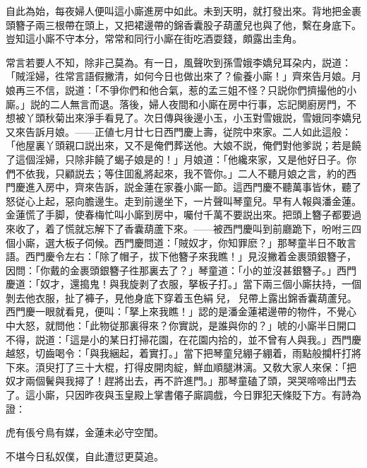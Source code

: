 自此為始，每夜婦人便叫這小廝進房中如此。未到天明，就打發出來。背地把金裹頭簪子兩三根帶在頭上，又把裙邊帶的錦香囊股子葫蘆兒也與了他，繫在身底下。豈知這小廝不守本分，常常和同行小廝在街吃酒耍錢，頗露出圭角。

常言若要人不知，除非己莫為。有一日，風聲吹到孫雪娥李嬌兒耳朶内，説道：「賊淫婦，徃常言語假撇清，如何今日也做出來了？偸養小廝！」齊來告月娘。月娘再三不信，説道：「不爭你們和他合氣，惹的孟三姐不怪？只説你們擠撮他的小廝。」説的二人無言而退。落後，婦人夜間和小廝在房中行事，忘記関廚房門，不想被丫頭秋菊出來淨手看見了。次日傳與後邊小玉，小玉對雪娥説，雪娥同李嬌兒又來告訴月娘。——正値七月廿七日西門慶上壽，従院中來家。二人如此這般：「他屋裏丫頭親口説出來，又不是俺們葬送他。大娘不説，俺們對他爹説；若是饒了這個淫婦，只除非饒了蝎子娘是的！」月娘道：「他纔來家，又是他好日子。你們不依我，只顧説去；等住囬亂將起來，我不管你。」二人不聽月娘之言，約的西門慶進入房中，齊來告訴，説金蓮在家養小廝一節。這西門慶不聽萬事皆休，聽了怒従心上起，惡向膽邊生。走到前邊坐下，一片聲叫琴童兒。早有人報與潘金蓮。金蓮慌了手脚，使春梅忙叫小廝到房中，囑付千萬不要説出來。把頭上簪子都要過來收了，着了慌就忘解下了香囊葫蘆下來。——被西門慶叫到前廳跪下，吩咐三四個小廝，選大板子伺候。西門慶問道：「賊奴才，你知罪麽？」那琴童半日不敢言語。西門慶令左右：「除了帽子，拔下他簪子來我瞧！」見沒撇着金裹頭銀簪子，因問：「你戴的金裹頭銀簪子徃那裏去了？」琴童道：「小的並沒甚銀簪子。」西門慶道：「奴才，還搗鬼！與我旋剥了衣服，拏板子打。」當下兩三個小廝扶持，一個剝去他衣服，扯了褲子，見他身底下穿着玉色絹𧜽兒，𧜽兒帶上露出錦香囊葫蘆兒。西門慶一眼就看見，便叫：「拏上來我瞧！」認的是潘金蓮裙邊帶的物件，不覺心中大怒，就問他：「此物従那裏得來？你實説，是誰與你的？」唬的小廝半日開口不得，説道：「這是小的某日打掃花園，在花園内拾的，並不曾有人與我。」西門慶越怒，切齒喝令：「與我綑起，着實打。」當下把琴童兒綳子綳着，雨點般攔杆打將下來。湏臾打了三十大棍，打得皮開肉綻，鮮血順腿淋漓。又敎大家人來保：「把奴才兩個鬢與我撏了！趕將出去，再不許進門。」那琴童磕了頭，哭哭啼啼出門去了。這小廝，只因昨夜與玉皇殿上掌書僊子廝調戲，今日罪犯天條貶下方。有詩為證：

\begin{myquote}
虎有倀兮鳥有媒，金蓮未必守空閨。

不堪今日私奴僕，自此遭愆更莫追。
\end{myquote}

